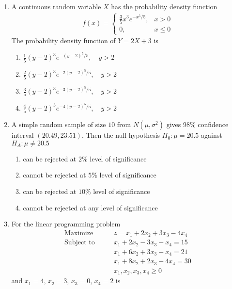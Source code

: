 \documentclass[journal]{IEEEtran}
\numberwithin{equation}{enumi}
\numberwithin{figure}{enumi}
\begin{document}
\begin{enumerate}
\item
A continuous random variable $X$ has the probability density function
\begin{align}
f(x) = 
\begin{cases}
\frac{3}{5} x^3 e^{-x^5/5}, & x > 0 \\
0, & x \leq 0
\end{cases}
\end{align}
The probability density function of $Y = 2X + 3$ is
\hfill{}
\begin{multicols}{2}
\begin{enumerate}
  \item $\frac{1}{5} (y-2)^3 e^{-(y-2)^5/5}, \quad y>2$
  \item $\frac{2}{5} (y-2)^3 e^{-2(y-2)^5/5}, \quad y>2$
  \item $\frac{3}{5} (y-2)^3 e^{-3(y-2)^5/5}, \quad y>2$
  \item $\frac{4}{5} (y-2)^3 e^{-4(y-2)^5/5}, \quad y>2$
\end{enumerate}
\end{multicols}

\item
A simple random sample of size $10$ from $N(\mu, \sigma^2)$ gives $98\%$ confidence interval $(20.49, 23.51)$. Then the null hypothesis $H_0: \mu = 20.5$ against $H_A: \mu \neq 20.5$

\hfill{}

\begin{enumerate}
  \item can be rejected at $2\%$ level of significance
  \item cannot be rejected at $5\%$ level of significance
  \item can be rejected at $10\%$ level of significance
  \item cannot be rejected at any level of significance
\end{enumerate}


\item
For the linear programming problem
\begin{align}
\text{Maximize} \qquad & z = x_1 + 2x_2 + 3x_3 - 4x_4 \\
\text{Subject to} \qquad & x_1 + 2x_2 - 3x_3 - x_4 = 15 \\
& x_1 + 6x_2 + 3x_3 - x_4 = 21 \\
& x_1 + 8x_2 + 2x_3 - 4x_4 = 30 \\
& x_1, x_2, x_3, x_4 \geq 0
\end{align}
and $x_1 = 4$, $x_2 = 3$, $x_3 = 0$, $x_4 = 2$ is
\hfill{}


\end{enumerate}
\end{document}
